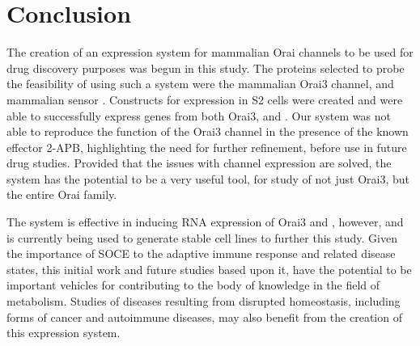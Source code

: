 \section{Conclusion}
The creation of an expression system for mammalian Orai \Ca{} channels to be used for drug discovery purposes was begun in this study. The proteins selected to probe the feasibility of using such a system were the mammalian Orai3 \Ca{} channel, and mammalian \Ca{} sensor \stim. Constructs for expression in S2 cells were created and were able to successfully express genes from both Orai3, and \stim. Our \droso{} system was not able to reproduce the function of the Orai3 channel in the presence of the known effector 2-APB, highlighting the need for further refinement, before use in future drug studies. Provided that the issues with channel expression are solved, the system has the potential to be a very useful tool, for study of not just Orai3, but the entire Orai family. 

The system is effective in inducing RNA expression of Orai3 and \stim{}, however, and is currently being used to generate stable cell lines to further this study. Given the importance of SOCE to the adaptive immune response and related disease states, this initial work and future studies based upon it, have the potential to be important vehicles for contributing to the body of knowledge in the field of \Ca{} metabolism. Studies of diseases resulting from disrupted \Ca{} homeostasis, including forms of cancer and autoimmune diseases, may also benefit from the creation of this expression system.







